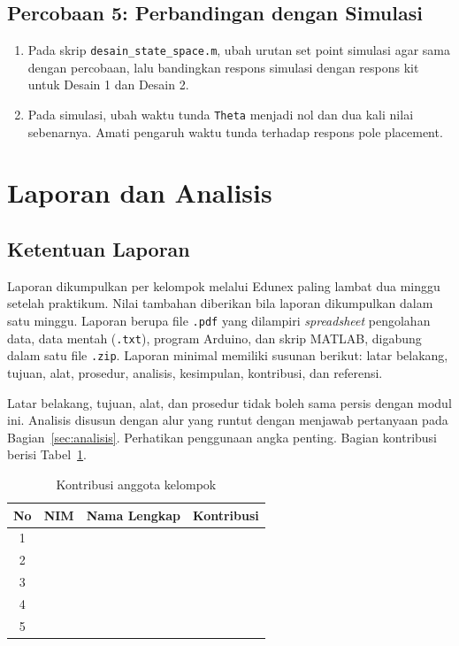\documentclass[11pt,a4paper]{article}
\newcommand{\prog}[1]{\texttt{#1}}
\begin{document}
\subsection{Percobaan 5: Perbandingan dengan Simulasi}
\begin{enumerate}
\item Pada skrip \prog{desain\_state\_space.m}, ubah urutan set point simulasi agar sama dengan percobaan, lalu bandingkan respons simulasi dengan respons kit untuk Desain 1 dan Desain 2.
\item Pada simulasi, ubah waktu tunda \texttt{Theta} menjadi nol dan dua kali nilai sebenarnya. Amati pengaruh waktu tunda terhadap respons pole placement.
\end{enumerate}

\section{Laporan dan Analisis}
\subsection{Ketentuan Laporan}
Laporan dikumpulkan per kelompok melalui Edunex paling lambat dua minggu setelah praktikum. Nilai tambahan diberikan bila laporan dikumpulkan dalam satu minggu. Laporan berupa file \texttt{.pdf} yang dilampiri \textit{spreadsheet} pengolahan data, data mentah (\texttt{.txt}), program Arduino, dan skrip MATLAB, digabung dalam satu file \texttt{.zip}. Laporan minimal memiliki susunan berikut: latar belakang, tujuan, alat, prosedur, analisis, kesimpulan, kontribusi, dan referensi.

Latar belakang, tujuan, alat, dan prosedur tidak boleh sama persis dengan modul ini. Analisis disusun dengan alur yang runtut dengan menjawab pertanyaan pada Bagian~\ref{sec:analisis}. Perhatikan penggunaan angka penting. Bagian kontribusi berisi Tabel~\ref{tab:kontribusi}.

\begin{table}[H]
\centering
\caption{Kontribusi anggota kelompok}
\label{tab:kontribusi}
\begin{tabularx}{\textwidth}{|c|c|l|X|}
\hline
\textbf{No} & \textbf{NIM} & \textbf{Nama Lengkap} & \textbf{Kontribusi} \\
\hline
1 & & & \\
2 & & & \\
3 & & & \\
4 & & & \\
5 & & & \\
\hline
\end{tabularx}
\end{table}
\end{document}
